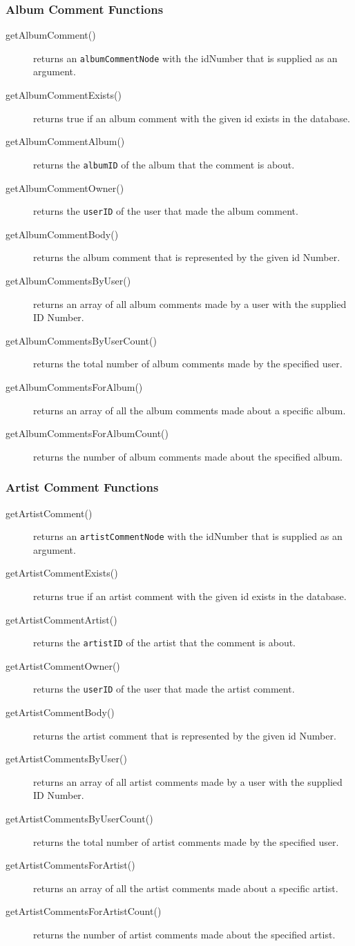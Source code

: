 \documentclass{article}
\begin{document}
\subsubsection{Album Comment Functions}
\begin{description}
\item[getAlbumComment()] returns an \verb|albumCommentNode| with the idNumber that is supplied as an argument. 
\item[getAlbumCommentExists()] returns true if an album comment with the given id exists in the database.
\item[getAlbumCommentAlbum()] returns the \verb|albumID| of the album that the comment is about.
\item[getAlbumCommentOwner()] returns the \verb|userID| of the user that made the album comment.
\item[getAlbumCommentBody()] returns the  album comment that is represented by the given id Number.
\item[getAlbumCommentsByUser()] returns an array of all album comments made by a user with the supplied ID Number.
\item[getAlbumCommentsByUserCount()] returns the total number of album comments made by the specified user.
\item[getAlbumCommentsForAlbum()] returns an array of all the album comments made about a specific album.
\item[getAlbumCommentsForAlbumCount()] returns the number of album comments made about the specified album.
\end{description}

\subsubsection{Artist Comment Functions}
\begin{description}
\item[getArtistComment()] returns an \verb|artistCommentNode| with the idNumber that is supplied as an argument. 
\item[getArtistCommentExists()] returns true if an artist comment with the given id exists in the database.
\item[getArtistCommentArtist()] returns the \verb|artistID| of the artist that the comment is about.
\item[getArtistCommentOwner()] returns the \verb|userID| of the user that made the artist comment.
\item[getArtistCommentBody()] returns the artist comment that is represented by the given id Number.
\item[getArtistCommentsByUser()] returns an array of all artist comments made by a user with the supplied ID Number.
\item[getArtistCommentsByUserCount()] returns the total number of artist comments made by the specified user.
\item[getArtistCommentsForArtist()] returns an array of all the artist comments made about a specific artist.
\item[getArtistCommentsForArtistCount()] returns the number of artist comments made about the specified artist.
\end{description}
\end{document}

